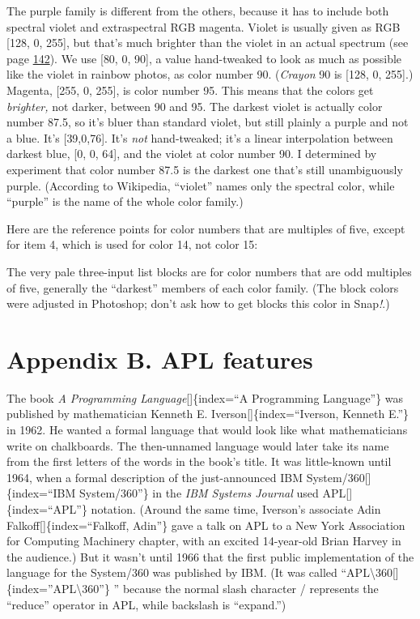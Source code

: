 \documentclass[
  letterpaper,
]{book}
\begin{document}
The purple family is different from the others, because it has to
include both spectral violet and extraspectral RGB magenta. Violet is
usually given as RGB {[}128, 0, 255{]}, but that's much brighter than
the violet in an actual spectrum (see page \hyperref[rainbow]{142}). We
use {[}80, 0, 90{]}, a value hand-tweaked to look as much as possible
like the violet in rainbow photos, as color number 90. (\emph{Crayon} 90
is {[}128, 0, 255{]}.) Magenta, {[}255, 0, 255{]}, is color number 95.
This means that the colors get \emph{brighter,} not darker, between 90
and 95. The darkest violet is actually color number 87.5, so it's bluer
than standard violet, but still plainly a purple and not a blue. It's
{[}39,0,76{]}. It's \emph{not} hand-tweaked; it's a linear interpolation
between darkest blue, {[}0, 0, 64{]}, and the violet at color number 90.
I determined by experiment that color number 87.5 is the darkest one
that's still unambiguously purple. (According to Wikipedia, ``violet''
names only the spectral color, while ``purple'' is the name of the whole
color family.)

Here are the reference points for color numbers that are multiples of
five, except for item 4, which is used for color 14, not color 15:

The very pale three-input list blocks are for color numbers that are odd
multiples of five, generally the ``darkest'' members of each color
family. (The block colors were adjusted in Photoshop; don't ask how to
get blocks this color in Snap\emph{!}.)

\chapter{Appendix B. APL features}\label{appendix-b.-apl-features}

The book \emph{A Programming Language}{[}{]}\{index=``A Programming
Language''\} was published by mathematician Kenneth E.
Iverson{[}{]}\{index=``Iverson, Kenneth E.''\} in 1962. He wanted a
formal language that would look like what mathematicians write on
chalkboards. The then-unnamed language would later take its name from
the first letters of the words in the book's title. It was little-known
until 1964, when a formal description of the just-announced IBM
System/360{[}{]}\{index=``IBM System/360''\} in the \emph{IBM Systems
Journal} used APL{[}{]}\{index=``APL''\} notation. (Around the same
time, Iverson's associate Adin Falkoff{[}{]}\{index=``Falkoff, Adin''\}
gave a talk on APL to a New York Association for Computing Machinery
chapter, with an excited 14-year-old Brian Harvey in the audience.) But
it wasn't until 1966 that the first public implementation of the
language for the System/360 was published by IBM. (It was called
``APL\textbackslash360{[}{]}\{index=''APL\textbackslash360''\} ''
because the normal slash character / represents the ``reduce'' operator
in APL, while backslash is ``expand.'')
\end{document}
